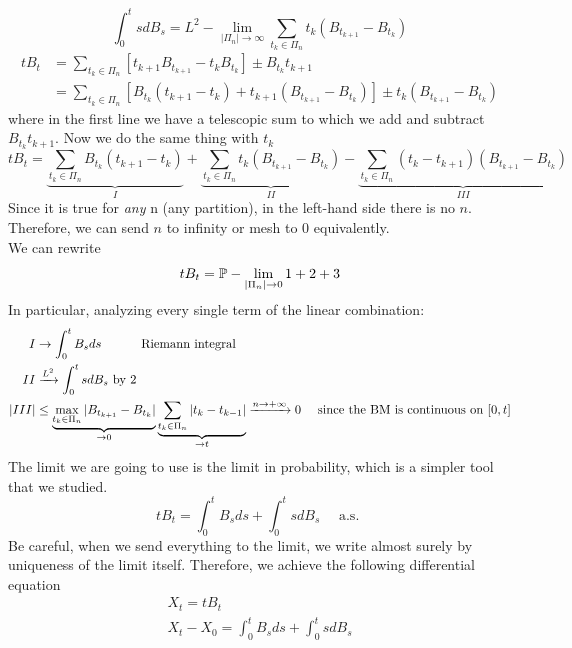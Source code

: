 \[
\int_0^t s dB_s = L^2-\lim_{|\Pi_n| \to \infty} \sum_{t_k \in \Pi_n} t_k (B_{t_{k+1}} - B_{t_k})
\]
\begin{align*}
    tB_t &= \sum_{t_k \in \Pi_n} [t_{k+1} B_{t_{k+1}} - {t_k}B_{t_k}] \pm B_{t_k}t_{k+1} \\
    &=  \sum_{t_k \in \Pi_n} [B_{t_k} (t_{k+1} - t_k) + t_{k+1}(B_{t_{k+1}} - B_{t_k})] \pm t_k (B_{t_{k+1}} - B_{t_k})
\end{align*}
where in the first line we have a telescopic sum to which we add and subtract $B_{t_k}t_{k+1}$. Now we do the same thing with $t_k$
\begin{equation*}
    t B_t = \underbrace{\sum_{t_k \in \Pi_n} B_{t_k} (t_{k+1} - t_k) }_{I}+ \underbrace{\sum_{t_k \in \Pi_n} t_{k}(B_{t_{k+1}} - B_{t_k})}_{II} -  \underbrace{\sum_{t_k \in \Pi_n}(t_k-t_{k+1}) (B_{t_{k+1}} - B_{t_k})}_{III}
\end{equation*}
Since it is true for \emph{any} n (any partition), in the left-hand side there is no $n$. Therefore, we can send $n$ to infinity or mesh to $0$ equivalently. \\
We can rewrite 
\begin{equation*}
    tB_t = \mathbb{P} -  \lim_{|\Pi_n|\rightarrow 0} 1 + 2 + 3
\end{equation*}
In particular, analyzing every single term of the linear combination:
\begin{align*}
    I& \rightarrow \int_0^t B_s ds \hspace{1 cm} \text{ Riemann integral}\\
    II& \xrightarrow{L^2} \int_0^t sdB_s  \text{ by } 2\\
    |III|& \leq \underbrace{\max_{t_k \in \Pi_n} |B_{t_{k+1}} - B_{t_k}|}_{\rightarrow 0} \underbrace{\sum_{t_k \in \Pi_n} |t_k - t_{k-1}| } _ {\rightarrow t} \xrightarrow{n \rightarrow +\infty} 0 \quad \text{ since the BM is continuous on $[0,t]$} 
\end{align*}
The limit we are going to use is the limit in probability, which is a simpler tool that we studied. 
\begin{equation*}
    tB_t = \int_0^t B_s ds + \int_0 ^t s dB_s \quad \text{ a.s. }
\end{equation*}
Be careful, when we send everything to the limit, we write almost surely by uniqueness of the limit itself. Therefore, we achieve the following differential equation
\begin{equation*}
\begin{split}
     X_t = tB_t\\
    X_t- X_0 = \int_0^t B_s ds + \int_0^t s  dB_s
\end{split}
\end{equation*}
